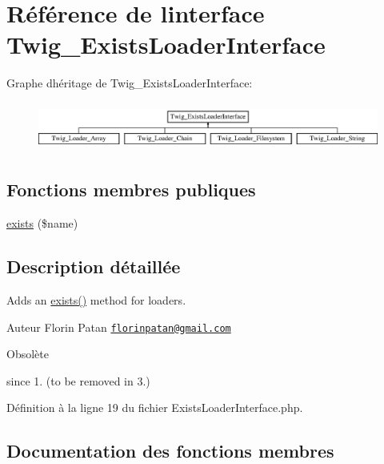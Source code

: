 \hypertarget{interface_twig___exists_loader_interface}{}\section{Référence de l\textquotesingle{}interface Twig\+\_\+\+Exists\+Loader\+Interface}
\label{interface_twig___exists_loader_interface}
Graphe d\textquotesingle{}héritage de Twig\+\_\+\+Exists\+Loader\+Interface\+:\begin{figure}[H]
\begin{center}
\leavevmode
\includegraphics[height=1.600000cm]{interface_twig___exists_loader_interface}
\end{center}
\end{figure}
\subsection*{Fonctions membres publiques}
\begin{DoxyCompactItemize}
\item 
\hyperlink{interface_twig___exists_loader_interface_a0909de156d39accf2e3c52f4bce3765f}{exists} (\$name)
\end{DoxyCompactItemize}


\subsection{Description détaillée}
Adds an \hyperlink{interface_twig___exists_loader_interface_a0909de156d39accf2e3c52f4bce3765f}{exists()} method for loaders.

\begin{DoxyAuthor}{Auteur}
Florin Patan \href{mailto:florinpatan@gmail.com}{\tt florinpatan@gmail.\+com}
\end{DoxyAuthor}
\begin{DoxyRefDesc}{Obsolète}
\item[\hyperlink{deprecated__deprecated000012}{Obsolète}]since 1. (to be removed in 3.) \end{DoxyRefDesc}


Définition à la ligne 19 du fichier Exists\+Loader\+Interface.\+php.



\subsection{Documentation des fonctions membres}
